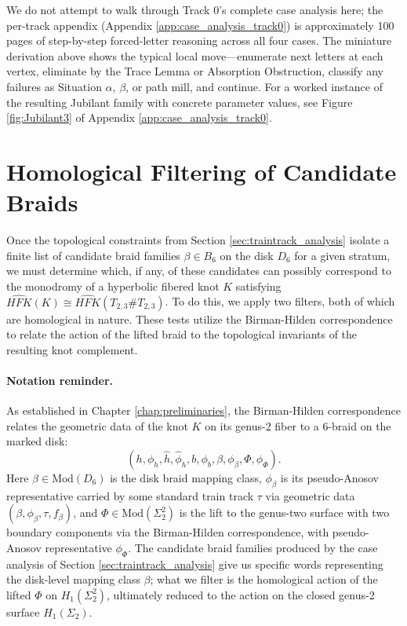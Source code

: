 \medskip

We do not attempt to walk through Track 0's complete case analysis here; the per-track appendix (Appendix \ref{app:case_analysis_track0}) is approximately 100 pages of step-by-step forced-letter reasoning across all four cases. The miniature derivation above shows the typical local move---enumerate next letters at each vertex, eliminate by the Trace Lemma or Absorption Obstruction, classify any failures as Situation $\alpha$, $\beta$, or path mill, and continue. For a worked instance of the resulting Jubilant family with concrete parameter values, see Figure \ref{fig:Jubilant3} of Appendix \ref{app:case_analysis_track0}.




\section{Homological Filtering of Candidate Braids}
\label{sec:homological_filtering}

Once the topological constraints from Section \ref{sec:traintrack_analysis} isolate a finite list of candidate braid families $\beta \in B_6$ on the disk $D_6$ for a given stratum, we must determine which, if any, of these candidates can possibly correspond to the monodromy of a hyperbolic fibered knot $K$ satisfying $\widehat{HFK}(K) \cong \widehat{HFK}(T_{2,3}\# T_{2,3})$. To do this, we apply two filters, both of which are homological in nature. These tests utilize the Birman-Hilden correspondence to relate the action of the lifted braid to the topological invariants of the resulting knot complement.

\paragraph{Notation reminder.} As established in Chapter \ref{chap:preliminaries}, the Birman-Hilden correspondence relates the geometric data of the knot $K$ on its genus-2 fiber to a 6-braid on the marked disk:
\[
(h, \phi_h, \hat{h}, \hat{\phi}_h, b, \phi_b, \beta, \phi_\beta, \Phi, \phi_\Phi).
\]
Here $\beta \in \mathrm{Mod}(D_6)$ is the disk braid mapping class, $\phi_\beta$ is its pseudo-Anosov representative carried by some standard train track $\tau$ via geometric data $(\beta, \phi_\beta, \tau, f_\beta)$, and $\Phi \in \mathrm{Mod}(\Sigma_2^2)$ is the lift to the genus-two surface with two boundary components via the Birman-Hilden correspondence, with pseudo-Anosov representative $\phi_\Phi$. The candidate braid families produced by the case analysis of Section \ref{sec:traintrack_analysis} give us specific words representing the disk-level mapping class $\beta$; what we filter is the homological action of the lifted $\Phi$ on $H_1(\Sigma_2^2)$, ultimately reduced to the action on the closed genus-2 surface $H_1(\Sigma_2)$.

